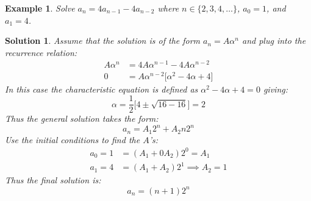 \documentclass[12pt, letterpaper, onecolumn, conference, final]{IEEEtran}
\theoremstyle{definition}
\theoremstyle{plain}
\newtheorem{example}{Example}[section]
\newtheorem{solution}{Solution}[section]
\begin{document}
\begin{example}
Solve $a_n=4a_{n-1}-4a_{n-2}$ where $n \in \{2,3,4,\dots\}$, $a_0=1$, and $a_1=4$.
\end{example}
\begin{solution}
Assume that the solution is of the form $a_n=A\alpha^n$ and plug into the recurrence relation:
\begin{equation*}
\begin{split}
A\alpha^n &= 4A\alpha^{n-1} - 4A\alpha^{n-2} \\
0 &= A\alpha^{n-2} \Big[ \alpha^2 - 4\alpha + 4 \Big]
\end{split}
\end{equation*}
In this case the characteristic equation is defined as $\alpha^2 - 4\alpha + 4 = 0$ giving:
\begin{equation*}
\alpha = \frac{1}{2} \Big[ 4 \pm \sqrt{16-16} \Big] = 2
\end{equation*}
Thus the general solution takes the form:
\begin{equation*}
a_n = A_1 2^n + A_2 n2^n
\end{equation*}
Use the initial conditions to find the $A$'s:
\begin{equation*}
\begin{split}
a_0 = 1 &= (A_1 + 0A_2)2^0 = A_1 \\
a_1 = 4 &= (A_1 + A_2)2^1 \implies A_2 = 1
\end{split}
\end{equation*}
Thus the final solution is:
\begin{equation*}
a_n = (n+1)2^n
\end{equation*}
\end{solution}
\end{document}
